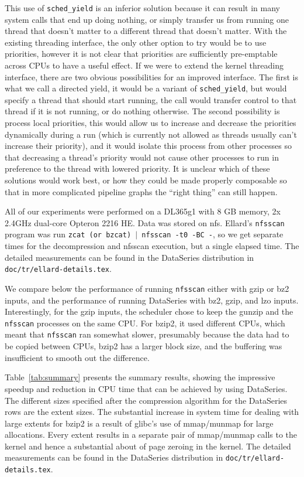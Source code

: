 \documentclass[twocolumn, 11pt]{article}
\begin{document}
This use of \texttt{sched\_yield} is an inferior solution because it
can result in many system calls that end up doing nothing, or simply
transfer us from running one thread that doesn't matter to a different
thread that doesn't matter.  With the existing threading interface,
the only other option to try would be to use priorities, however it is
not clear that priorities are sufficiently pre-emptable across CPUs to
have a useful effect.  If we were to extend the kernel threading
interface, there are two obvious possibilities for an improved
interface.  The first is what we call a directed yield, it would be a
variant of \texttt{sched\_yield}, but would specify a thread that should start
running, the call would transfer control to that thread if it is not
running, or do nothing otherwise.  The second possibility is process
local priorities, this would allow us to increase and decrease the
priorities dynamically during a run (which is currently not allowed as
threads usually can't increase their priority), and it would isolate
this process from other processes so that decreasing a thread's
priority would not cause other processes to run in preference to the
thread with lowered priority.  It is unclear which of these solutions
would work best, or how they could be made properly composable so that
in more complicated pipeline graphs the ``right thing'' can still
happen.

All of our experiments were performed on a DL365g1 with 8 GB memory,
2x 2.4GHz dual-core Opteron 2216 HE.  Data was stored on nfs.
Ellard's \texttt{nfsscan} program was run \texttt{zcat (or bzcat) $|$
nfsscan -t0 -BC -}, so we get separate times for the decompression and
nfsscan execution, but a single elapsed time.  The detailed
measurements can be found in the DataSeries distribution in
\texttt{doc/tr/ellard-details.tex}.



We compare below the performance of running \texttt{nfsscan} either
with gzip or bz2 inputs, and the performance of running DataSeries
with bz2, gzip, and lzo inputs.  Interestingly, for the gzip inputs,
the scheduler chose to keep the gunzip and the \texttt{nfsscan}
processes on the same CPU.  For bzip2, it used different CPUs, which
meant that \texttt{nfsscan} ran somewhat slower, presumably because
the data had to be copied between CPUs, bzip2 has a larger block size,
and the buffering was insufficient to smooth out the difference.

Table~\ref{tab:summary} presents the summary results, showing the
impressive speedup and reduction in CPU time that can be achieved by
using DataSeries.  The different sizes specified after the compression
algorithm for the DataSeries rows are the extent sizes. 
The substantial increase in system time for dealing
with large extents for bzip2 is a result of glibc's use of mmap/munmap
for large allocations.  Every extent results in a separate pair of
mmap/munmap calls to the kernel and hence a substantial about of page
zeroing in the kernel.  The detailed measurements can be found 
in the DataSeries distribution in \texttt{doc/tr/ellard-details.tex}.
\end{document}
